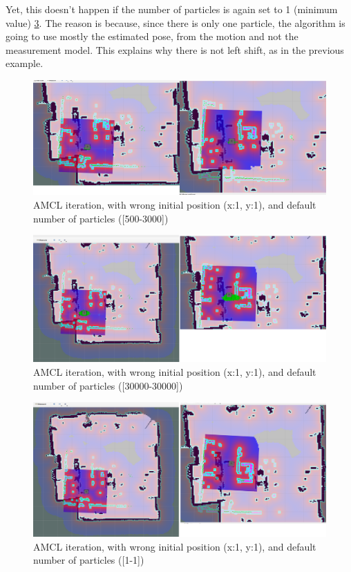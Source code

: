 Yet, this doesn't happen if the number of particles is again set to 1 (minimum value) \ref{fig:amcl-lab-rosbag-1-1-1-1}. The reason is because, since there is only one particle, the algorithm is going to use mostly the estimated pose, from the motion and not the measurement model. This explains why there is not left shift, as in the previous example.

\begin{figure}
    \centering
    \includegraphics[width=1\linewidth]{amcl-lab-rosbag-1-1-500-3000.png}
    \caption{AMCL iteration, with wrong initial position (x:1, y:1), and default number of particles ([500-3000])}
    \label{fig:amcl-lab-rosbag-1-1-500-3000}
\end{figure}

\begin{figure}
    \centering
    \includegraphics[width=1\linewidth]{amcl-lab-rosbag-1-1-30000-30000.png}
    \caption{AMCL iteration, with wrong initial position (x:1, y:1), and default number of particles ([30000-30000])}
    \label{fig:amcl-lab-rosbag-1-1-30000-30000}
\end{figure}

\begin{figure}
    \centering
    \includegraphics[width=1\linewidth]{amcl-lab-rosbag-1-1-1-1.png}
    \caption{AMCL iteration, with wrong initial position (x:1, y:1), and default number of particles ([1-1])}
    \label{fig:amcl-lab-rosbag-1-1-1-1}
\end{figure}